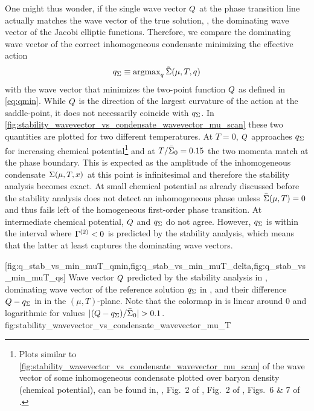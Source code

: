 One might thus wonder, if the single wave vector $Q$ at the phase transition line actually matches the wave vector of the true solution, \ie{}, the dominating wave vector of the Jacobi elliptic functions.
Therefore, we compare the dominating wave vector of the correct inhomogeneous condensate minimizing the effective action 
\begin{equation}
	q_{\Sigma} \equiv \mathrm{argmax}_q \, \tilde{\Sigma} ( \mu, T, q )
\end{equation}
with the wave vector that minimizes the two-point function $Q$ as defined in \cref{eq:qmin}.
While $Q$ is the direction of the largest curvature of the action at the saddle-point, it does not necessarily coincide with $q_{\Sigma}$.
In \cref{fig:stability_wavevector_vs_condensate_wavevector_mu_scan} these two quantities  are plotted for two different temperatures.
At ${T = 0}$, $Q$ approaches $q_{\Sigma}$ for increasing chemical potential\footnote{Plots similar to \cref{fig:stability_wavevector_vs_condensate_wavevector_mu_scan} of the wave vector of some inhomogeneous condensate plotted over baryon density (chemical potential), can be found in, \eg{}, Fig.~2 of , Fig.~2 of , Figs.~6 \& 7 of .} and at ${T/\bar{\Sigma}_0 = 0.15}$ the two momenta match at the phase boundary.
This is expected as the amplitude of the inhomogeneous condensate $\Sigma ( \mu, T, x )$ at this point is infinitesimal and therefore the stability analysis becomes exact.
At small chemical potential \dash{} as already discussed before \dash{} the stability analysis does not detect an inhomogeneous phase unless ${\bar{\Sigma} ( \mu, T ) = 0}$ and thus fails left of the homogeneous first-order phase transition.
At intermediate chemical potential, $Q$ and $q_{\Sigma}$ do not agree.
However, $q_{\Sigma}$ is within the interval where $\Gamma^{(2)} < 0$ is predicted by the stability analysis, which means that the latter at least captures the dominating wave vectors.

	[fig:q_stab_vs_min_muT_qmin,fig:q_stab_vs_min_muT_delta,fig:q_stab_vs_min_muT_qs]%
	{%
		Wave vector  $Q$  predicted by the stability analysis in , dominating wave vector of the reference solution $q_{\Sigma}$ in , and their difference $Q-q_{\Sigma}$ in  in the $(\mu,T)$-plane.
		Note that the colormap in  is linear around $0$ and logarithmic for values $|(\qmin-\qs)/\snull|>0.1$.
	}%
	{fig:stability_wavevector_vs_condensate_wavevector_mu_T}%

